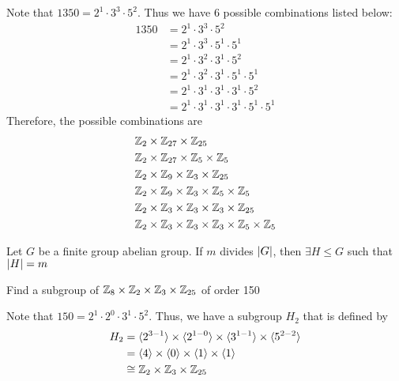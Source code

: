 \begin{solution}
    Note that $1350 = 2^1 \cdot 3^3 \cdot 5^2$. Thus we have 6 possible combinations listed below:
    \begin{align*}
        1350 &= 2^1 \cdot 3^3 \cdot 5^2 \\
        &= 2^1 \cdot 3^3 \cdot 5^1 \cdot 5^1 \\
        &= 2^1 \cdot 3^2 \cdot 3^1 \cdot 5^2 \\
        &= 2^1 \cdot 3^2 \cdot 3^1 \cdot 5^1 \cdot 5^1 \\
        &= 2^1 \cdot 3^1 \cdot 3^1 \cdot 3^1 \cdot 5^2 \\
        &= 2^1 \cdot 3^1 \cdot 3^1 \cdot 3^1 \cdot 5^1 \cdot 5^1
    \end{align*}
    Therefore, the possible combinations are
    \begin{align*}
        & \mathbb{Z}_{2} \times \mathbb{Z}_{27} \times \mathbb{Z}_{25} \\
        & \mathbb{Z}_{2} \times \mathbb{Z}_{27} \times \mathbb{Z}_{5} \times \mathbb{Z}_{5} \\
        & \mathbb{Z}_{2} \times \mathbb{Z}_{9} \times \mathbb{Z}_{3} \times \mathbb{Z}_{25} \\
        & \mathbb{Z}_{2} \times \mathbb{Z}_{9} \times \mathbb{Z}_{3} \times \mathbb{Z}_{5} \times \mathbb{Z}_{5} \\
        & \mathbb{Z}_{2} \times \mathbb{Z}_{3} \times \mathbb{Z}_{3} \times \mathbb{Z}_{3} \times \mathbb{Z}_{25} \\
        & \mathbb{Z}_{2} \times \mathbb{Z}_{3} \times \mathbb{Z}_{3} \times \mathbb{Z}_{3} \times \mathbb{Z}_{5} \times \mathbb{Z}_{5} 
    \end{align*}
\end{solution}

\begin{remark}
    Let $G$ be a finite group abelian group. If $m$ divides $\qty|G|$, then $\exists H \leq G$ such that $\qty|H| = m$
\end{remark}

\begin{exercise}
    Find a subgroup of $\mathbb{Z}_8 \times \mathbb{Z}_2 \times \mathbb{Z}_3 \times \mathbb{Z}_{25}$ of order 150
\end{exercise}

\begin{solution}
    Note that $150 = 2^1 \cdot 2^0 \cdot 3^1 \cdot 5^2$. Thus, we have a subgroup $H_2$ that is defined by
    \begin{align*}
        H_2 &= \langle 2^{3-1} \rangle \times \langle 2^{1- 0} \rangle \times \langle 3^{1 - 1} \rangle \times \langle 5^{2 - 2} \rangle \\
        &= \langle 4 \rangle \times \langle 0 \rangle \times \langle 1 \rangle \times \langle 1 \rangle \\
        &\cong \mathbb{Z}_2 \times \mathbb{Z}_3 \times \mathbb{Z}_{25}
    \end{align*}
\end{solution}